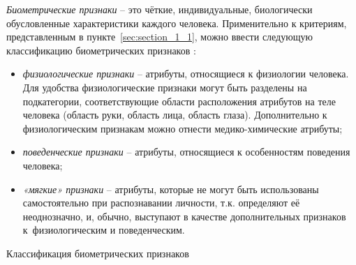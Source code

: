 \documentclass[12pt]{book}
\begin{document}
\large{\textit{Биометрические признаки} -- это чёткие, индивидуальные, биологически обусловленные характеристики каждого человека. Применительно к критериям, представленным в пункте~\ref{sec:section_1_1}, можно ввести следующую классификацию биометрических признаков \cite{unar_2014}:

\begin{itemize}[topsep=1pt] \itemsep0.1em
\item \textit{физиологические признаки} -- атрибуты, относящиеся к физиологии человека. Для удобства физиологические признаки могут быть разделены на подкатегории, соответствующие области расположения атрибутов на теле человека (область руки, область лица, область глаза). Дополнительно к физиологическим признакам можно отнести медико-химические атрибуты;
\item \textit{поведенческие признаки} -- атрибуты, относящиеся к особенностям поведения человека;
\item \textit{«мягкие» признаки} -- атрибуты, которые не могут быть использованы самостоятельно при распознавании личности, т.к. определяют её неоднозначно, и, обычно, выступают в качестве дополнительных признаков к~физиологическим и поведенческим.
\end{itemize}

\begin{table}[h]
\centering
\caption{\label{tab:table_1_2}Классификация биометрических признаков}


\end{table}}
\end{document}
